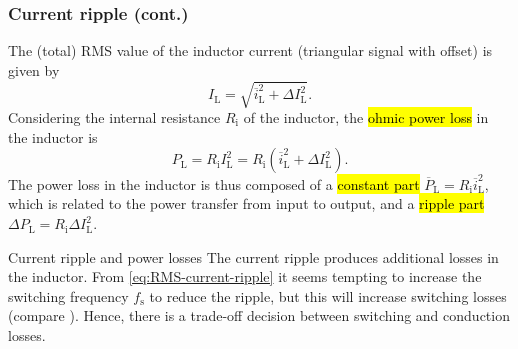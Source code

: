 \begin{frame}
	\frametitle{Current ripple (cont.)}
	The (total) RMS value of the inductor current (triangular signal with offset) is given by
	\begin{equation}
		I_\mathrm{L} = \sqrt{\overline{i}^2_\mathrm{L} + \Delta I^2_\mathrm{L}}.
	\end{equation}
	\pause
	Considering the internal resistance $R_\mathrm{i}$ of the inductor, the \hl{ohmic power loss} in the inductor is
	\begin{equation}
		P_\mathrm{L} = R_\mathrm{i} I^2_\mathrm{L} = R_\mathrm{i} \left(\overline{i}^2_\mathrm{L} + \Delta I^2_\mathrm{L}\right).
		\label{eq:power-loss-ripple-inductor-step-down-converter}
	\end{equation}
	\pause
	The power loss in the inductor is thus composed of a \hl{constant part} $\overline{P}_\mathrm{L} = R_\mathrm{i} \overline{i}^2_\mathrm{L}$, which is related to the power transfer from input to output, and a \hl{ripple part} $\Delta P_\mathrm{L} = R_\mathrm{i} \Delta I^2_\mathrm{L}$.
	\pause%
	\begin{varblock}{Current ripple and power losses}
		The current ripple produces additional losses in the inductor. From \eqref{eq:RMS-current-ripple} it seems tempting to increase the switching frequency $f_\mathrm{s}$ to reduce the ripple, but this will increase switching losses (compare ). Hence, there is a trade-off decision between switching and conduction losses.
	\end{varblock}
\end{frame}

